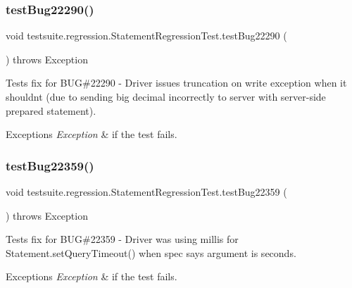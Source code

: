 \subsubsection{\texorpdfstring{test\+Bug22290()}{testBug22290()}}
{\footnotesize\ttfamily void testsuite.\+regression.\+Statement\+Regression\+Test.\+test\+Bug22290 (\begin{DoxyParamCaption}{ }\end{DoxyParamCaption}) throws Exception}

Tests fix for B\+UG\#22290 -\/ Driver issues truncation on write exception when it shouldn\textquotesingle{}t (due to sending big decimal incorrectly to server with server-\/side prepared statement).


\begin{DoxyExceptions}{Exceptions}
{\em Exception} & if the test fails. \\
\hline
\end{DoxyExceptions}
\mbox{\label{classtestsuite_1_1regression_1_1_statement_regression_test_a0e9ad9980acf6229f9b41dff9972e1c5}} 
\subsubsection{\texorpdfstring{test\+Bug22359()}{testBug22359()}}
{\footnotesize\ttfamily void testsuite.\+regression.\+Statement\+Regression\+Test.\+test\+Bug22359 (\begin{DoxyParamCaption}{ }\end{DoxyParamCaption}) throws Exception}

Tests fix for B\+UG\#22359 -\/ Driver was using millis for Statement.\+set\+Query\+Timeout() when spec says argument is seconds.


\begin{DoxyExceptions}{Exceptions}
{\em Exception} & if the test fails. \\
\hline
\end{DoxyExceptions}
\mbox{\label{classtestsuite_1_1regression_1_1_statement_regression_test_ad2c60d7105fb694d073cddbd8e1cdd48}} 
